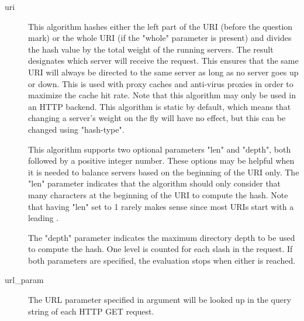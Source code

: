 \begin{description}
      \item[uri]
                  This algorithm hashes either the left part of the URI (before
                  the question mark) or the whole URI (if the "whole" parameter
                  is present) and divides the hash value by the total weight of
                  the running servers. The result designates which server will
                  receive the request. This ensures that the same URI will
                  always be directed to the same server as long as no server
                  goes up or down. This is used with proxy caches and
                  anti-virus proxies in order to maximize the cache hit rate.
                  Note that this algorithm may only be used in an HTTP backend.
                  This algorithm is static by default, which means that
                  changing a server's weight on the fly will have no effect,
                  but this can be changed using "hash-type".

                  This algorithm supports two optional parameters "len" and
                  "depth", both followed by a positive integer number. These
                  options may be helpful when it is needed to balance servers
                  based on the beginning of the URI only. The "len" parameter
                  indicates that the algorithm should only consider that many
                  characters at the beginning of the URI to compute the hash.
                  Note that having "len" set to 1 rarely makes sense since most
                  URIs start with a leading \chr{/}.

                  The "depth" parameter indicates the maximum directory depth
                  to be used to compute the hash. One level is counted for each
                  slash in the request. If both parameters are specified, the
                  evaluation stops when either is reached.

      \item[url\_param]
                  The URL parameter specified in argument will be looked up in
                  the query string of each HTTP GET request.


\end{description}
